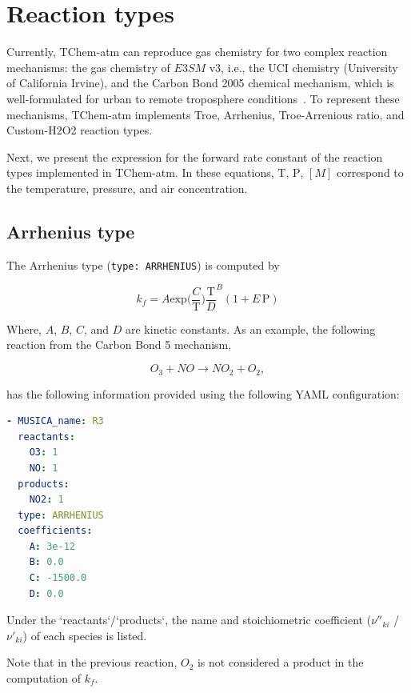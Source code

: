 \documentclass[report, 12pt]{SANDreport}
\newcommand{\eee}{E3SM}
\begin{document}
\section{Reaction types}
Currently, TChem-atm can reproduce gas chemistry for two complex reaction mechanisms: the gas chemistry of $\eee{}$ v3, i.e., the UCI chemistry (University of California Irvine), and the Carbon Bond 2005 chemical mechanism, which is well-formulated for urban to remote troposphere conditions~\cite{Yarwood2005,Dawson2022}.
To represent these mechanisms, TChem-atm implements Troe, Arrhenius, Troe-Arrenious ratio, and Custom-H2O2 reaction types.

Next, we present the expression for the forward rate constant of the reaction types implemented in TChem-atm. In these equations, $\mathrm{T}$, $\mathrm{P}$, $[M]$ correspond to the temperature, pressure, and air concentration.

\subsection{Arrhenius type}

The Arrhenius type (\verb|type: ARRHENIUS|) is computed by

\begin{equation}
k_f = A \mathrm{exp} \Big( \frac{C}{\mathrm{T}} \Big)  \frac{\mathrm{T}}{D}^B (1+ E\,\mathrm{P})
\end{equation}

Where, $A$, $B$, $C$, and $D$ are kinetic constants. As an example, the following reaction from the Carbon Bond 5 mechanism,

\begin{equation}
O_3 + NO \rightarrow NO_2 + O_2,
\end{equation}

has the following information provided using the following YAML configuration:

\begin{lstlisting}[language=yaml]
- MUSICA_name: R3
  reactants:
    O3: 1
    NO: 1
  products:
    NO2: 1
  type: ARRHENIUS
  coefficients:
    A: 3e-12
    B: 0.0
    C: -1500.0
    D: 0.0
\end{lstlisting}

Under the `reactants`/`products`, the name and stoichiometric coefficient ($\nu''_{ki}$ /$\nu'_{ki}$) of each species is listed.

Note that in the previous reaction, $O_2$ is not considered a product in the computation of $k_f$.
\end{document}
